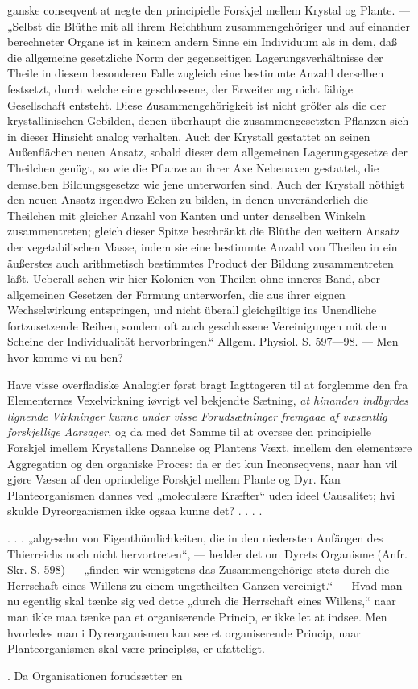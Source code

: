 \documentclass[12pt,a4paper]{book}
\begin{document}
{ganske conseqvent at negte den principielle Forskjel mellem Krystal og
Plante. --- „Selbst die Blüthe mit all ihrem Reichthum
zusammengehöriger und auf einander berechneter
Organe ist in keinem andern Sinne ein Individuum als in dem, daß die
allgemeine gesetzliche Norm der gegenseitigen Lagerungsverhältnisse der
Theile in diesem besonderen Falle zugleich eine bestimmte Anzahl
derselben festsetzt, durch welche eine geschlossene, der Erweiterung
nicht fähige Gesellschaft entsteht. Diese Zusammengehörigkeit ist nicht
größer als die der krystallinischen Gebilden, denen überhaupt die
zusammengesetzten Pflanzen sich in dieser Hinsicht analog verhalten.
Auch der Krystall gestattet an seinen Außenflächen neuen Ansatz, sobald
dieser dem allgemeinen Lagerungsgesetze der Theilchen genügt, so wie die
Pflanze an ihrer Axe Nebenaxen gestattet, die demselben Bildungsgesetze
wie jene unterworfen sind. Auch der Krystall nöthigt den neuen Ansatz
irgendwo Ecken zu bilden, in denen unveränderlich die Theilchen mit
gleicher Anzahl von Kanten und unter denselben Winkeln zusammentreten;
gleich dieser Spitze beschränkt die Blüthe den weitern Ansatz der
vegetabilischen Masse, indem sie eine bestimmte Anzahl von Theilen in ein
äußerstes auch arithmetisch bestimmtes Product der Bildung
zusammentreten läßt. Ueberall sehen wir hier Kolonien von Theilen ohne
inneres Band, aber allgemeinen Gesetzen der Formung unterworfen, die aus
ihrer eignen Wechselwirkung entspringen, und nicht überall gleichgiltige
ins Unendliche fortzusetzende Reihen, sondern oft auch geschlossene
Vereinigungen mit dem Scheine der Individualität hervorbringen.“ Allgem.
Physiol. S. 597---98.
--- Men hvor komme vi nu hen?
\par Have visse overfladiske Analogier først bragt Iagttageren til at
forglemme den fra Elementernes Vexelvirkning iøvrigt vel bekjendte
Sætning, \emph{at hinanden indbyrdes lignende Virkninger kunne under
visse Forudsætninger fremgaae af væsentlig forskjellige Aarsager,} og da
med det Samme til at oversee den principielle Forskjel imellem
Krystallens Dannelse og Plantens Væxt, imellem den elementære
Aggregation og den organiske Proces: da er det kun Inconseqvens, naar han
vil gjøre Væsen af den oprindelige Forskjel mellem Plante og Dyr. Kan
Planteorganismen dannes ved „moleculære Kræfter“ uden ideel Causalitet;
hvi skulde Dyreorganismen ikke ogsaa kunne det? . . . .
\par . . . „abgesehn von Eigenthümlichkeiten, die in den niedersten
Anfängen des Thierreichs noch nicht hervortreten“, --- hedder det om
Dyrets Organisme (Anfr. Skr. S. 598) --- „finden wir wenigstens das
Zusammengehörige stets durch die Herrschaft eines Willens zu einem
ungetheilten Ganzen vereinigt.“ --- Hvad man nu egentlig skal tænke sig
ved dette „durch die Herrschaft eines Willens,“ naar man ikke maa tænke
paa et organiserende Princip, er ikke let at indsee. Men hvorledes man i
Dyreorganismen kan see et organiserende Princip, naar Planteorganismen
skal være principløs, er ufatteligt.}. Da Organisationen forudsætter en
\end{document}
